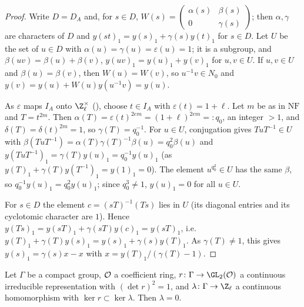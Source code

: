 \begin{proof}
Write $D=D_A$ and, for $s\in D$, $W(s)=\left(\begin{smallmatrix}\alpha(s)&\beta(s)\\0&\gamma(s)\end{smallmatrix}\right)$; then
$\alpha,\gamma$ are characters of $D$ and $y(st)_1=y(s)_1+\gamma(s)y(t)_1$ for $s\in D$. Let $U$ be the set of $u\in D$ with
$\alpha(u)=\gamma(u)=\varepsilon(u)=1$; it is a subgroup, and $\beta(uv)=\beta(u)+\beta(v)$, $y(uv)_1=y(u)_1+y(v)_1$ for $u,v\in U$. If
$u,v\in U$ and $\beta(u)=\beta(v)$, then $W(u)=W(v)$, so $u^{-1}v\in N_0$ and $y(v)=y(u)+W(u)y(u^{-1}v)=y(u)$.

As $\varepsilon$ maps $I_A$ onto $\Z_\ell^\times$ (), choose $t\in I_A$ with
$\varepsilon(t)=1+\ell$. Let $m$ be as in $\mathrm{NF}$ and $T=t^{2m}$. Then $\alpha(T)=\varepsilon(t)^{2em}=(1+\ell)^{2em}=:q_0$, an integer
$>1$, and $\delta(T)=\delta(t)^{2m}=1$, so $\gamma(T)=q_0^{-1}$. For $u\in U$, conjugation gives $TuT^{-1}\in U$ with
$\beta(TuT^{-1})=\alpha(T)\gamma(T)^{-1}\beta(u)=q_0^2\beta(u)$ and $y(TuT^{-1})_1=\gamma(T)y(u)_1=q_0^{-1}y(u)_1$ (as
$y(T)_1+\gamma(T)y(T^{-1})_1=y(1)_1=0$). The element $u^{q_0^2}\in U$ has the same $\beta$, so $q_0^{-1}y(u)_1=q_0^2y(u)_1$;
since $q_0^3\ne1$, $y(u)_1=0$ for all $u\in U$.

For $s\in D$ the element $c=(sT)^{-1}(Ts)$ lies in $U$ (its diagonal entries and its cyclotomic character are $1$). Hence
$y(Ts)_1=y(sT)_1+\gamma(sT)y(c)_1=y(sT)_1$, i.e.\ $y(T)_1+\gamma(T)y(s)_1=y(s)_1+\gamma(s)y(T)_1$. As $\gamma(T)\ne1$, this gives
$y(s)_1=\gamma(s)x-x$ with $x=y(T)_1/(\gamma(T)-1)$.
\end{proof}

\begin{lemma}\label{pf:kato:hompadic}
Let $\Gamma$ be a compact group, $\mathcal{O}$ a coefficient ring, $r\colon\Gamma\to\GL_2(\katoO)$ a continuous irreducible representation
with $(\det r)^2=1$, and $\lambda\colon\Gamma\to\Z_\ell$ a continuous homomorphism with $\ker r\subset\ker\lambda$. Then $\lambda=0$.
\end{lemma}


